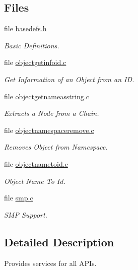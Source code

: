 \subsection*{Files}
\begin{DoxyCompactItemize}
\item 
file \mbox{\hyperlink{basedefs_8h}{basedefs.\+h}}
\begin{DoxyCompactList}\small\item\em Basic Definitions. \end{DoxyCompactList}\item 
file \mbox{\hyperlink{objectgetinfoid_8c}{objectgetinfoid.\+c}}
\begin{DoxyCompactList}\small\item\em Get Information of an Object from an ID. \end{DoxyCompactList}\item 
file \mbox{\hyperlink{objectgetnameasstring_8c}{objectgetnameasstring.\+c}}
\begin{DoxyCompactList}\small\item\em Extracts a Node from a Chain. \end{DoxyCompactList}\item 
file \mbox{\hyperlink{objectnamespaceremove_8c}{objectnamespaceremove.\+c}}
\begin{DoxyCompactList}\small\item\em Removes Object from Namespace. \end{DoxyCompactList}\item 
file \mbox{\hyperlink{objectnametoid_8c}{objectnametoid.\+c}}
\begin{DoxyCompactList}\small\item\em Object Name To Id. \end{DoxyCompactList}\item 
file \mbox{\hyperlink{smp_8c}{smp.\+c}}
\begin{DoxyCompactList}\small\item\em S\+MP Support. \end{DoxyCompactList}\end{DoxyCompactItemize}


\subsection{Detailed Description}
Provides services for all A\+P\+Is. 

